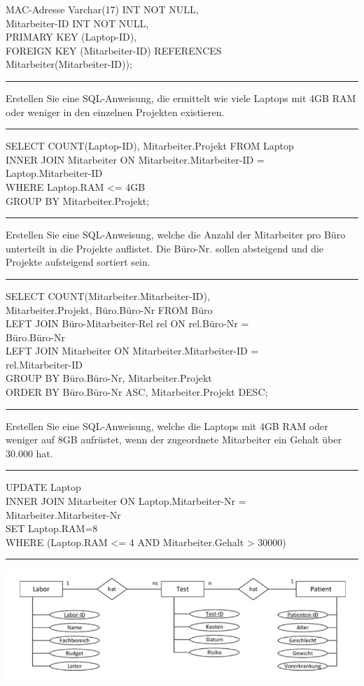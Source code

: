 \documentclass[5pt]{article}
\begin{document}
\begin{multicols*}{2}
MAC-Adresse Varchar(17) INT NOT NULL,\\
Mitarbeiter-ID INT NOT NULL,\\
PRIMARY KEY (Laptop-ID),\\
FOREIGN KEY (Mitarbeiter-ID) REFERENCES\\
Mitarbeiter(Mitarbeiter-ID));\\
\rule{\columnwidth}{0.5pt}
Erstellen Sie eine SQL-Anweisung, die ermittelt wie viele Laptops mit 4GB RAM
oder weniger in den einzelnen Projekten existieren.
\rule{\columnwidth}{0.5pt}
SELECT COUNT(Laptop-ID), Mitarbeiter.Projekt FROM Laptop\\
INNER JOIN Mitarbeiter ON Mitarbeiter.Mitarbeiter-ID =\\
Laptop.Mitarbeiter-ID\\
WHERE Laptop.RAM <= 4GB\\
GROUP BY Mitarbeiter.Projekt;\\
\rule{\columnwidth}{0.5pt}
Erstellen Sie eine SQL-Anweisung, welche die Anzahl der Mitarbeiter pro Büro
unterteilt in die Projekte auflistet. Die Büro-Nr. sollen absteigend und die Projekte
aufsteigend sortiert sein.
\rule{\columnwidth}{0.5pt}
SELECT COUNT(Mitarbeiter.Mitarbeiter-ID),\\
Mitarbeiter.Projekt, Büro.Büro-Nr FROM Büro\\
LEFT JOIN Büro-Mitarbeiter-Rel rel ON rel.Büro-Nr =\\
Büro.Büro-Nr\\
LEFT JOIN Mitarbeiter ON Mitarbeiter.Mitarbeiter-ID =\\
rel.Mitarbeiter-ID\\
GROUP BY Büro.Büro-Nr, Mitarbeiter.Projekt\\
ORDER BY Büro.Büro-Nr ASC, Mitarbeiter.Projekt DESC;\\
\rule{\columnwidth}{0.5pt}
Erstellen Sie eine SQL-Anweisung, welche die Laptops mit 4GB RAM oder weniger
auf 8GB aufrüstet, wenn der zugeordnete Mitarbeiter ein Gehalt über 30.000 hat.
\rule{\columnwidth}{0.5pt}
UPDATE Laptop\\
INNER JOIN Mitarbeiter ON Laptop.Mitarbeiter-Nr =\\
Mitarbeiter.Mitarbeiter-Nr\\
SET Laptop.RAM=8\\
WHERE (Laptop.RAM <= 4 AND Mitarbeiter.Gehalt > 30000)\\
\rule{\columnwidth}{0.5pt}
\includegraphics[width= \columnwidth]{images/ss20erd.png}\\

\end{multicols*}
\end{document}
